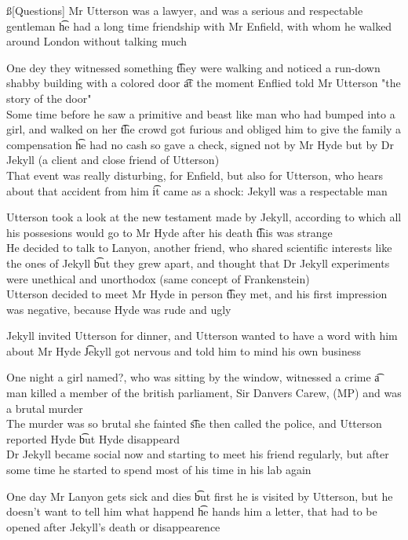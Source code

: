 \documentclass[12pt]{article}
\begin{document}
\ss[Questions]
\sss[Q1]
Mr Utterson was a lawyer, and was a serious and respectable gentleman \t he had a long time friendship with Mr Enfield, with whom he walked around London without talking much

\sss[Q2]
One dey they witnessed something \t they were walking and noticed a run-down shabby building with a colored door \t at the moment Enflied told Mr Utterson "the story of the door" \\
Some time before he saw a primitive and beast like man who had bumped into a girl, and walked on her \t the crowd got furious and obliged him to give the family a compensation \t he had no cash so gave a check, signed not by Mr Hyde but by Dr Jekyll (a client and close friend of Utterson) \\
That event was really disturbing, for Enfield, but also for Utterson, who hears about that accident from him \t it came as a shock: Jekyll was a respectable man

\sss[Q3]
Utterson took a look at the new testament made by Jekyll, according to which all his possesions would go to Mr Hyde after his death \t this was strange \\
He decided to talk to Lanyon, another friend, who shared scientific interests like the ones of Jekyll \t but they grew apart, and thought that Dr Jekyll experiments were unethical and unorthodox (same concept of Frankenstein) \\
Utterson decided to meet Mr Hyde in person \t they met, and his first impression was negative, because Hyde was rude and ugly

\sss[Q4]
Jekyll invited Utterson for dinner, and Utterson wanted to have a word with him about Mr Hyde \t Jekyll got nervous and told him to mind his own business

\sss[Q5]
One night a girl named?, who was sitting by the window, witnessed a crime \t a man killed a member of the british parliament, Sir Danvers Carew, (MP) and was a brutal murder \\
The murder was so brutal she fainted \t she then called the police, and Utterson reported Hyde \t but Hyde disappeard \\
Dr Jekyll became social now and starting to meet his friend regularly, but after some time he started to spend most of his time in his lab again

\sss[Q6]
One day Mr Lanyon gets sick and dies \t but first he is visited by Utterson, but he doesn't want to tell him what happend \t he hands him a letter, that had to be opened after Jekyll's death or disappearence
\end{document}
